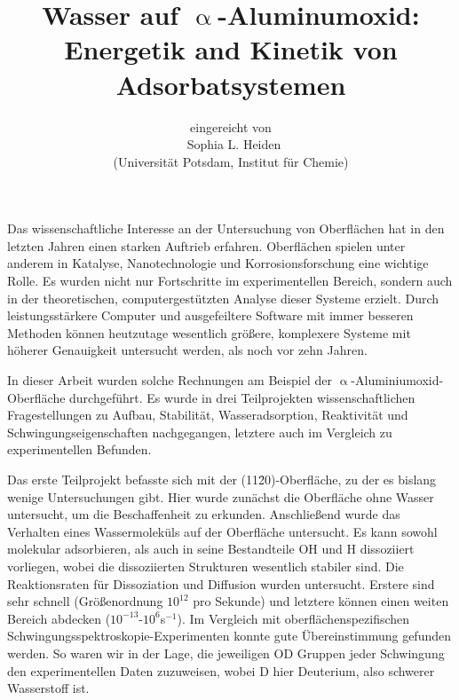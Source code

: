\documentclass[11pt,DIV=13,a4paper,headinclude,german]{scrartcl}
\begin{document}
\titlehead{\centering\normalfont\large\scshape Allgemeinverständliche Zusammenfassung}
\title{\Large\vspace{-\baselineskip} Wasser auf $\upalpha$-Aluminumoxid:\\
  Energetik and Kinetik von Adsorbatsystemen \vspace{0\baselineskip}}
\author{\large\sffamily eingereicht von\\
  \Large\textbf\sffamily\ Sophia L. Heiden\\
  \large\sffamily (Universit\"{a}t Potsdam, Institut f\"{u}r Chemie)}
\date{}
\maketitle
\vspace{-1cm}
Das wissenschaftliche Interesse an der Untersuchung von Oberflächen hat in den letzten Jahren einen starken Auftrieb erfahren.
Oberflächen spielen unter anderem in Katalyse, Nanotechnologie und Korrosionsforschung eine wichtige Rolle.
Es wurden nicht nur Fortschritte im experimentellen Bereich, sondern auch in der theoretischen, computergestützten Analyse dieser Systeme erzielt.
Durch leistungsstärkere Computer und ausgefeiltere Software mit immer besseren Methoden können heutzutage wesentlich größere, komplexere Systeme mit höherer Genauigkeit untersucht werden, als noch vor zehn Jahren.

In dieser Arbeit wurden solche Rechnungen am Beispiel der $\upalpha$-Aluminiumoxid-Oberfläche durchgeführt.
Es wurde in drei Teilprojekten wissenschaftlichen Fragestellungen zu Aufbau, Stabilität, Wasseradsorption, Reaktivität und Schwingungseigenschaften nachgegangen, letztere auch im Vergleich zu experimentellen Befunden.

Das erste Teilprojekt befasste sich mit der (11\=20)-Oberfläche, zu der es bislang wenige Untersuchungen gibt.
Hier wurde zunächst die Oberfläche ohne Wasser %
untersucht, um die Beschaffenheit zu erkunden.
Anschließend wurde das Verhalten eines Wassermoleküls auf der Oberfläche untersucht.
Es kann sowohl molekular adsorbieren, als auch in seine Bestandteile OH und H dissoziiert vorliegen, wobei die dissoziierten Strukturen wesentlich stabiler sind.
Die Reaktionsraten für Dissoziation und Diffusion wurden untersucht. Erstere sind sehr schnell (Größenordnung $10^{12}$ pro Sekunde) und letztere können einen weiten Bereich abdecken ($10^{-13}$-$10^6$s$^{-1}$).
Im Vergleich mit oberflächenspezifischen Schwin\-gungs\-spek\-tros\-ko\-pie-Experimenten konnte gute Übereinstimmung gefunden werden.
So waren wir in der Lage, die jeweiligen OD Gruppen jeder Schwingung den experimentellen Daten zuzuweisen, wobei D hier Deuterium, also schwerer Wasserstoff ist.
\end{document}
